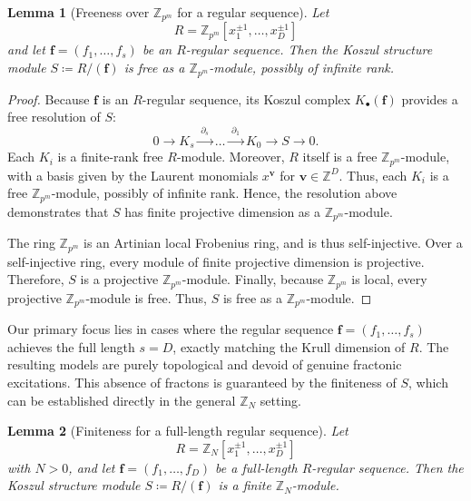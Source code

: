 \documentclass[aps,prx,english,superscriptaddress,twocolumn,tightenlines,showpacs,longbibliography,floatfix,amsfonts]{revtex4-2}
\newtheorem{lemma}{Lemma}
\theoremstyle{remark}
\theoremstyle{definition}
\begin{document}
\begin{lemma}[Freeness over $\mathbb{Z}_{p^m}$ for a regular sequence]
	\label{lem:free-Zpm}
	Let
	\[
	R = \mathbb{Z}_{p^m}[x_1^{\pm1},\dots,x_D^{\pm1}]
	\]
	and let $\mathbf{f}=(f_1,\dots,f_s)$ be an $R$-regular sequence. Then the Koszul structure module $S \coloneqq R/(\mathbf{f})$ is free as a $\mathbb{Z}_{p^m}$-module, possibly of infinite rank.
\end{lemma}

\begin{proof}
	Because $\mathbf{f}$ is an $R$-regular sequence, its Koszul complex $K_\bullet(\mathbf{f})$ provides a free resolution of $S$:
	\[
	0 \longrightarrow K_s \xrightarrow{\;\partial_s\;} \dots \xrightarrow{\;\partial_1\;} K_0 \longrightarrow S \longrightarrow 0.
	\]
	Each $K_i$ is a finite-rank free $R$-module. Moreover, $R$ itself is a free $\mathbb{Z}_{p^m}$-module, with a basis given by the Laurent monomials $x^{\mathbf{v}}$ for $\mathbf{v}\in\mathbb{Z}^D$. Thus, each $K_i$ is a free $\mathbb{Z}_{p^m}$-module, possibly of infinite rank. Hence, the resolution above demonstrates that $S$ has finite projective dimension as a $\mathbb{Z}_{p^m}$-module.

	The ring $\mathbb{Z}_{p^m}$ is an Artinian local Frobenius ring, and is thus self-injective. Over a self-injective ring, every module of finite projective dimension is projective. Therefore, $S$ is a projective $\mathbb{Z}_{p^m}$-module. Finally, because $\mathbb{Z}_{p^m}$ is local, every projective $\mathbb{Z}_{p^m}$-module is free. Thus, $S$ is free as a $\mathbb{Z}_{p^m}$-module.
\end{proof}

Our primary focus lies in cases where the regular sequence $\mathbf{f}=(f_1,\dots,f_s)$ achieves the full length $s=D$, exactly matching the Krull dimension of $R$. The resulting models are purely topological and devoid of genuine fractonic excitations. This absence of fractons is guaranteed by the finiteness of $S$, which can be established directly in the general $\mathbb{Z}_N$ setting.

\begin{lemma}[Finiteness for a full-length regular sequence]
	\label{lem:finite-full-length-ZN}
	Let
	\[
	R=\mathbb{Z}_N[x_1^{\pm1},\dots,x_D^{\pm1}]
	\]
	with $N>0$, and let $\mathbf{f}=(f_1,\dots,f_D)$ be a full-length $R$-regular sequence. Then the Koszul structure module $S \coloneqq R/(\mathbf{f})$ is a finite $\mathbb{Z}_N$-module.
\end{lemma}
\end{document}
